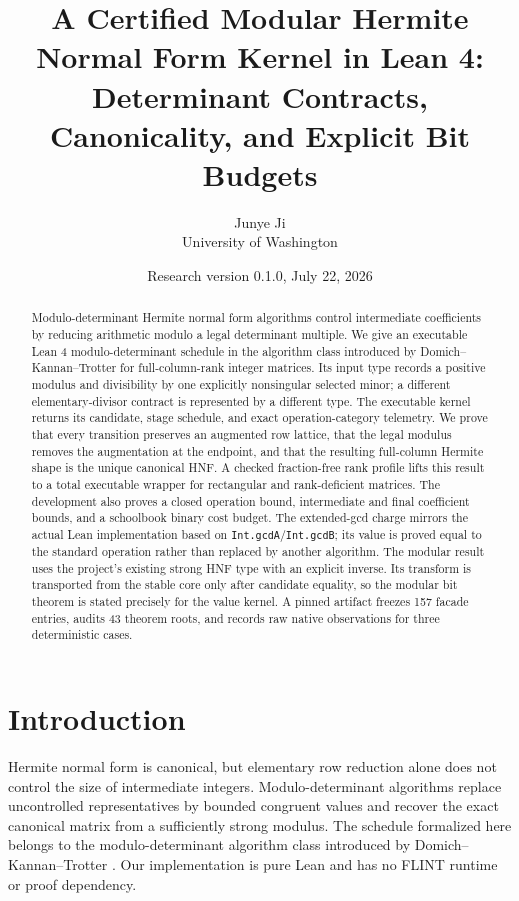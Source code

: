 \documentclass[11pt]{article}
\title{A Certified Modular Hermite Normal Form Kernel in Lean 4:\\
Determinant Contracts, Canonicality, and Explicit Bit Budgets}
\author{Junye Ji\\University of Washington}
\date{Research version 0.1.0, July 22, 2026}
\newcommand{\code}[1]{\texttt{#1}}
\begin{document}
\maketitle

\begin{abstract}
Modulo-determinant Hermite normal form algorithms control intermediate
coefficients by reducing arithmetic modulo a legal determinant multiple.  We
give an executable Lean 4 modulo-determinant schedule in the algorithm class
introduced by Domich--Kannan--Trotter for full-column-rank integer matrices.
Its input type records a
positive modulus and divisibility by one explicitly nonsingular selected
minor; a different elementary-divisor contract is represented by a different
type.  The executable kernel returns its candidate, stage schedule, and exact
operation-category telemetry.  We prove that every transition preserves an
augmented row lattice, that the legal modulus removes the augmentation at the
endpoint, and that the resulting full-column Hermite shape is the unique
canonical HNF.  A checked fraction-free rank profile lifts this result to a
total executable wrapper for rectangular and rank-deficient matrices.  The
development also proves a closed operation bound, intermediate and final
coefficient bounds, and a schoolbook binary cost budget.  The extended-gcd
charge mirrors the actual Lean implementation based on
\code{Int.gcdA}/\code{Int.gcdB}; its value is proved equal to the standard
operation rather than replaced by another algorithm.  The modular result uses
the project's existing strong HNF type with an explicit inverse.  Its
transform is transported from the stable core only after candidate equality,
so the modular bit theorem is stated precisely for the value kernel.  A
pinned artifact freezes 157 facade entries, audits 43 theorem roots, and
records raw native observations for three deterministic cases.
\end{abstract}

\section{Introduction}

Hermite normal form is canonical, but elementary row reduction alone does not
control the size of intermediate integers.  Modulo-determinant algorithms
replace uncontrolled representatives by bounded congruent values and recover
the exact canonical matrix from a sufficiently strong modulus.  The schedule
formalized here belongs to the modulo-determinant algorithm class introduced
by Domich--Kannan--Trotter \citep{domichKannanTrotter1987}.  Our implementation
is pure Lean and has no FLINT runtime or proof dependency.
\end{document}
